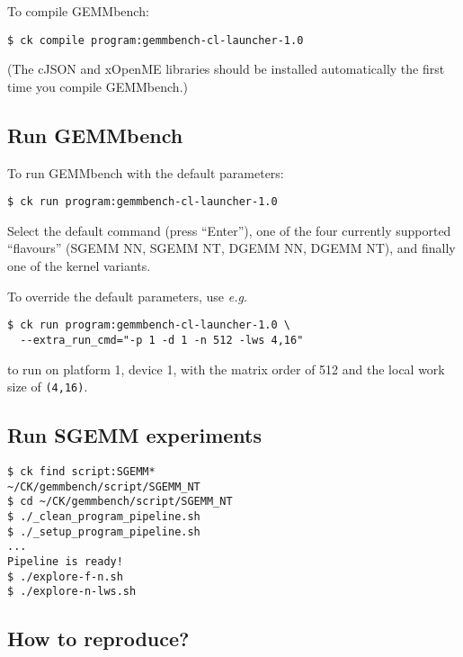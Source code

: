 \documentclass{acm_proc_article-sp} %
\begin{document}
To compile GEMMbench:
%
\begin{verbatim}
$ ck compile program:gemmbench-cl-launcher-1.0
\end{verbatim}
%
(The cJSON and xOpenME libraries should be installed automatically the first
time you compile GEMMbench.)

\subsection{Run GEMMbench}

To run GEMMbench with the default parameters:
%
\begin{verbatim}
$ ck run program:gemmbench-cl-launcher-1.0
\end{verbatim}

Select the default command (press ``Enter''), one of the four currently
supported ``flavours'' (SGEMM NN, SGEMM NT, DGEMM NN, DGEMM NT), and finally
one of the kernel variants.

To override the default parameters, use {\em e.g.}
%
\begin{verbatim}
$ ck run program:gemmbench-cl-launcher-1.0 \
  --extra_run_cmd="-p 1 -d 1 -n 512 -lws 4,16"
\end{verbatim}
%
to run on platform 1, device 1, with the matrix order of 512 and
the local work size of {\tt (4,16)}.

\subsection{Run SGEMM experiments}

\begin{verbatim}
$ ck find script:SGEMM*
~/CK/gemmbench/script/SGEMM_NT
$ cd ~/CK/gemmbench/script/SGEMM_NT
$ ./_clean_program_pipeline.sh
$ ./_setup_program_pipeline.sh
...
Pipeline is ready!
$ ./explore-f-n.sh
$ ./explore-n-lws.sh
\end{verbatim}

\subsection{How to reproduce?}
\label{sec:reproduce}
\end{document}

